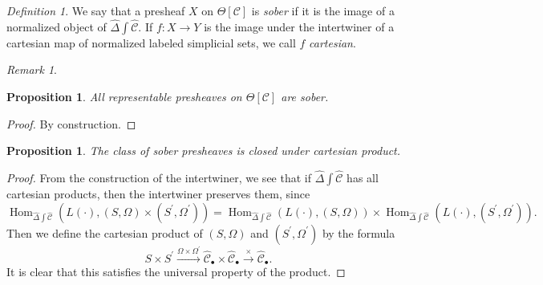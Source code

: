 \documentclass{amsart}
\numberwithin{equation}{section}
\theoremstyle{plain}   %
\newtheorem{prop}[subsection]{Proposition}
\theoremstyle{remark}
\newtheorem{rem}[subsection]{Remark}
\newtheorem{defn}[subsection]{Definition}
\theoremstyle{plain}
\DeclareMathOperator{\Hom}{Hom}
\newcommand{\psh}[1]{\ensuremath{\widehat{#1}}}
\newcommand{\C}{\ensuremath{\mathcal{C}}}
\begin{document}
\begin{defn} We say that a presheaf \(X\) on \(\Theta[\C]\) is \emph{sober} if it is the image of a normalized object of \(\psh{\Delta}\int \psh{\C}\). If \(f:X\to Y\) is the image under the intertwiner of a cartesian map of normalized labeled simplicial sets, we call \(f\) \emph{cartesian}.
\end{defn}

\begin{rem}
\end{rem}

\begin{prop} All representable presheaves on \(\Theta[\C]\) are sober.
\end{prop}
\begin{proof} By construction.
\end{proof}

\begin{prop} The class of sober presheaves is closed under cartesian product.
\end{prop}
\begin{proof} From the construction of the intertwiner, we see that if \(\psh{\Delta}\int \psh{\C}\) has all cartesian products, then the intertwiner preserves them, since
	\[\Hom_{\psh{\Delta}\int\psh{\C}}(L(\cdot), (S,\Omega)\times (S^\prime,\Omega^\prime))=\Hom_{\psh{\Delta}\int\psh{\C}}(L(\cdot), (S,\Omega))\times \Hom_{\psh{\Delta}\int\psh{\C}}(L(\cdot), (S^\prime,\Omega^\prime)).\] Then we define the cartesian product of \((S,\Omega)\) and \((S^\prime,\Omega^\prime)\) by the formula \[S\times S^\prime \xrightarrow{\Omega \times \Omega^\prime} \psh{\C}_\bullet \times \psh{\C}_\bullet \xrightarrow{\times} \psh{\C}_\bullet.\]  It is clear that this satisfies the universal property of the product.
\end{proof}
\end{document}
